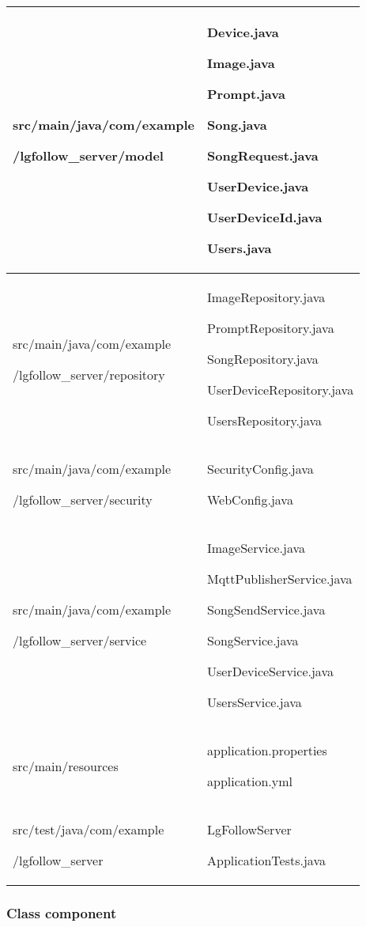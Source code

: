 \documentclass[conference]{IEEEtran}
\begin{document}
\begin{table}[h!]
\begin{tabular}{|p{4.1cm}|p{4.1cm}|}
        src/main/java/com/example \par /lgfollow\_server/model & Device.java \par Image.java \par Prompt.java \par Song.java \par SongRequest.java \par UserDevice.java \par UserDeviceId.java \par Users.java \\ \hline
        src/main/java/com/example \par /lgfollow\_server/repository & ImageRepository.java \par PromptRepository.java \par SongRepository.java \par UserDeviceRepository.java \par UsersRepository.java \\ \hline
        src/main/java/com/example\par /lgfollow\_server/security & SecurityConfig.java \par WebConfig.java \\ \hline
        src/main/java/com/example \par /lgfollow\_server/service & ImageService.java \par MqttPublisherService.java \par SongSendService.java \par SongService.java \par UserDeviceService.java \par UsersService.java \\ \hline
        src/main/resources & application.properties \par application.yml \\ \hline
        src/test/java/com/example \par /lgfollow\_server & LgFollowServer\par ApplicationTests.java \\ \hline
    \end{tabular}
\end{table}

\subsubsection{Class component}
\end{document}
